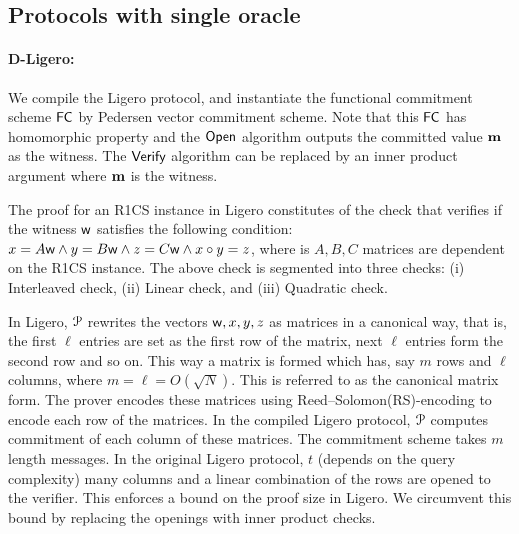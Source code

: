 \subsection{Protocols with single oracle}
\paragraph*{D-Ligero:}
We compile the Ligero protocol, and instantiate the functional commitment scheme $\mathsf{FC}$ by Pedersen vector commitment scheme. Note that this $\mathsf{FC}$ has homomorphic property and the $\mathsf{Open}$ algorithm outputs the committed value ${\bf m}$ as the witness. The $\mathsf{Verify}$ algorithm can be replaced by an inner product argument where ${\bf m}$ is the witness.

The proof for an R1CS instance in Ligero constitutes of the check that verifies if the witness $\mathsf{w}$ satisfies the following condition: $x = A \mathsf{w} \land y = B \mathsf{w} \land z = C \mathsf{w} \land x \circ y = z$, where is $A, B, C$ matrices are dependent on the R1CS instance. The above check is segmented into three checks: (i) Interleaved check, (ii) Linear check, and (iii) Quadratic check. 

In Ligero, $\mathcal{P}$ rewrites the vectors $\mathsf{w}, x, y, z$ as matrices in a canonical way, that is, the first $\ell$ entries are set as the first row of the matrix, next $\ell$ entries form the second row and so on. This way a matrix is formed which has, say $m$ rows and $\ell$ columns, where $m = \ell = O(\sqrt{N})$. This is referred to as the canonical matrix form. The prover encodes these matrices using Reed–Solomon(RS)-encoding to encode each row of the matrices.
In the compiled Ligero protocol, $\mathcal{P}$ computes commitment of each column of these matrices. The commitment scheme takes $m$ length messages. In the original Ligero protocol, $t$ (depends on the query complexity) many columns and a linear combination of the rows are opened to the verifier. This enforces a bound on the proof size in Ligero. We circumvent this bound by replacing the openings with inner product checks. 

